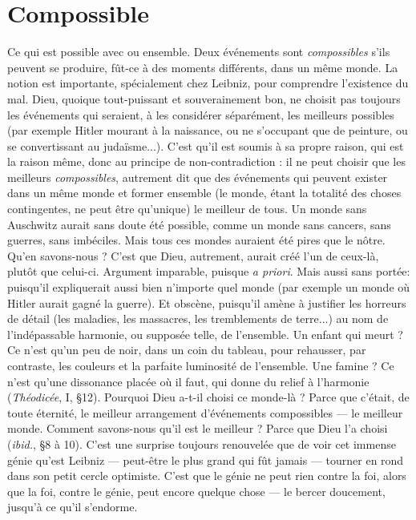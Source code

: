 \section{Compossible}
Ce qui est possible avec ou ensemble. Deux événements
sont {\it compossibles} s'ils peuvent se produire, fût-ce à des
moments différents, dans un même monde. La notion est importante, spécialement
chez Leibniz, pour comprendre l’existence du mal. Dieu, quoique tout-puissant
et souverainement bon, ne choisit pas toujours les événements qui
seraient, à les considérer séparément, les meilleurs possibles (par exemple Hitler
mourant à la naissance, ou ne s’occupant que de peinture, ou se convertissant
au judaïsme...). C’est qu’il est soumis à sa propre raison, qui est la raison
même, donc au principe de non-contradiction : il ne peut choisir que les
meilleurs {\it compossibles}, autrement dit que des événements qui peuvent exister
dans un même monde et former ensemble (le monde, étant la totalité des
choses contingentes, ne peut être qu’unique) le meilleur de tous. Un monde
sans Auschwitz aurait sans doute été possible, comme un monde sans cancers,
sans guerres, sans imbéciles. Mais tous ces mondes auraient été pires que le
nôtre. Qu’en savons-nous ? C’est que Dieu, autrement, aurait créé l’un de
ceux-là, plutôt que celui-ci. Argument imparable, puisque {\it a priori}. Mais aussi
sans portée: puisqu'il expliquerait aussi bien n’importe quel monde (par
exemple un monde où Hitler aurait gagné la guerre). Et obscène, puisqu'il
amène à justifier les horreurs de détail (les maladies, les massacres, les tremblements
de terre...) au nom de l’indépassable harmonie, ou supposée telle, de
l’ensemble. Un enfant qui meurt ? Ce n’est qu’un peu de noir, dans un coin du
tableau, pour rehausser, par contraste, les couleurs et la parfaite luminosité de
l’ensemble. Une famine ? Ce n’est qu’une dissonance placée où il faut, qui
donne du relief à l’harmonie ({\it Théodicée}, I, \S 12). Pourquoi Dieu a-t-il choisi ce
monde-là ? Parce que c'était, de toute éternité, le meilleur arrangement d’événements
compossibles — le meilleur monde. Comment savons-nous qu’il est le
meilleur ? Parce que Dieu l’a choisi ({\it ibid.}, \S 8 à 10). C’est une surprise toujours
renouvelée que de voir cet immense génie qu’est Leibniz — peut-être le plus
grand qui fût jamais — tourner en rond dans son petit cercle optimiste. C’est
que le génie ne peut rien contre la foi, alors que la foi, contre le génie, peut
encore quelque chose — le bercer doucement, jusqu’à ce qu’il s’endorme.

